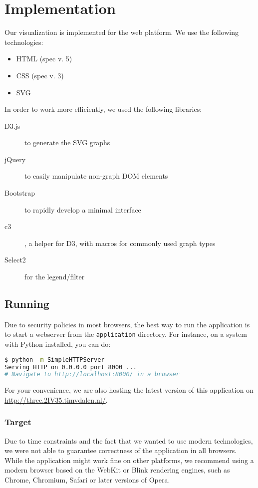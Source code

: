\section{Implementation}\label{Sec:Imp}

	Our visualization is implemented for the web platform.
	We use the following technologies:

	\begin{itemize}
		\item HTML (spec v. 5)
		\item CSS (spec v. 3)
		\item SVG
	\end{itemize}

	In order to work more efficiently, we used the following libraries:

	\begin{description}
		\item[D3.js] to generate the SVG graphs
		\item[jQuery] to easily manipulate non-graph DOM elements
		\item[Bootstrap] to rapidly develop a minimal interface
		\item[c3], a helper for D3, with macros for commonly used graph types
		\item[Select2] for the legend/filter
	\end{description}

	\subsection{Running}
		Due to security policies in most browsers, the best way to run the application is to start a webserver from the \texttt{application} directory.
		For instance, on a system with Python installed, you can do:

		\begin{lstlisting}[language=bash]
$ python -m SimpleHTTPServer
Serving HTTP on 0.0.0.0 port 8000 ...
# Navigate to http://localhost:8000/ in a browser
		\end{lstlisting}

		For your convenience, we are also hosting the latest version of this application on \url{http://three.2IV35.timvdalen.nl/}.

		\subsubsection{Target}
			Due to time constraints and the fact that we wanted to use modern technologies, we were not able to guarantee correctness of the application in all browsers.
			While the application might work fine on other platforms, we recommend using a modern browser based on the WebKit or Blink rendering engines, such as Chrome, Chromium, Safari or later versions of Opera.

